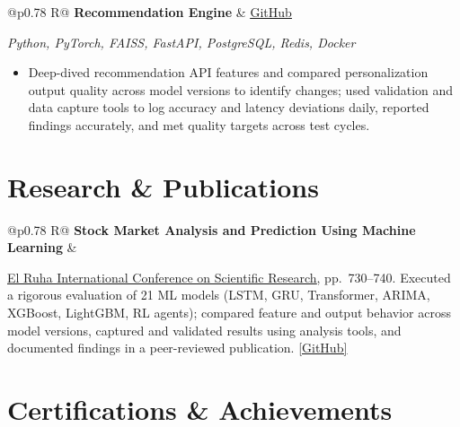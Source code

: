 \documentclass[a4paper,10pt]{article}
\newcommand{\ulink}[2]{\href{#1}{\uline{#2}}}
\newcommand{\subheading}[1]{{\color[HTML]{0A0A0A}\fontsize{12}{14}\selectfont\bfseries #1}}
\newcommand{\techstack}[1]{{\color[HTML]{5C5C5C}\fontsize{10.5}{12.5}\selectfont\itshape #1}}
\newcommand{\meta}[1]{{\color[HTML]{5C5C5C}\fontsize{10.5}{12.5}\selectfont #1}}
\begin{document}
\begin{tabularx}{\linewidth}{@{}p{0.78\linewidth} R@{}}
\subheading{Recommendation Engine} & \meta{\ulink{https://github.com/su-jin1425/Recommendation-Engine}{GitHub}}
\end{tabularx}
\vspace{1pt}
\techstack{Python, PyTorch, FAISS, FastAPI, PostgreSQL, Redis, Docker}
\begin{itemize}[nosep, leftmargin=1.5em, itemsep=1pt, topsep=2pt]
\item {\color[HTML]{0A0A0A}\fontsize{11}{14}\selectfont
Deep-dived recommendation API features and compared personalization output quality across model versions to identify changes; used validation and data capture tools to log accuracy and latency deviations daily, reported findings accurately, and met quality targets across test cycles.}
\end{itemize}

\vspace{2pt}

\section{Research \& Publications}
\vspace{2pt}

\begin{tabularx}{\linewidth}{@{}p{0.78\linewidth} R@{}}
\subheading{Stock Market Analysis and Prediction Using Machine Learning} & \meta{2025}
\end{tabularx}
\vspace{1pt}
{\color[HTML]{0A0A0A}\fontsize{11}{14}\selectfont
\ulink{https://www.elruha.org/_files/ugd/614b1f_6b95e1b697bf452b9907ba46e0151c05.pdf\#page=774}{El Ruha International Conference on Scientific Research}, pp.\ 730--740. Executed a rigorous evaluation of 21 ML models (LSTM, GRU, Transformer, ARIMA, XGBoost, LightGBM, RL agents); compared feature and output behavior across model versions, captured and validated results using analysis tools, and documented findings in a peer-reviewed publication. \ulink{https://github.com/su-jin1425/Set-Project}{[GitHub]}}

\vspace{2pt}

\section{Certifications \& Achievements}
\vspace{2pt}
\end{document}
